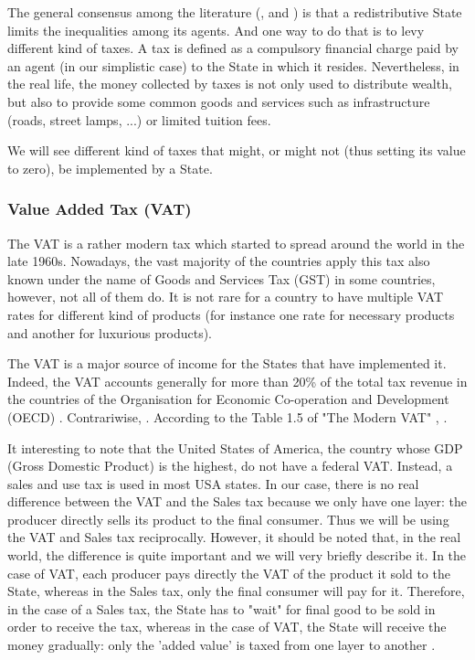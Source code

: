     The general consensus among the literature (\cite{burman2012taxes}, \cite{leigh2008redistributive} and \cite{taxes_inequalities}) is that a redistributive State limits the inequalities among its agents. And one way to do that is to levy different kind of taxes. A tax is defined as a compulsory financial charge paid by an agent (in our simplistic case) to the State in which it resides. 
    Nevertheless, in the real life, the money collected by taxes is not only used to distribute wealth, but also to provide some common goods and services such as infrastructure (roads, street lamps, ...) or limited tuition fees.
    
    We will see different kind of taxes that might, or might not (thus setting its value to zero), be implemented by a State.

    \subsubsection{Value Added Tax (VAT)}
    
    The VAT is a rather modern tax which started to spread around the world in the late 1960s. Nowadays, the vast majority of the countries apply this tax also known under the name of Goods and Services Tax (GST) in some countries, however, not all of them do. It is not rare for a country to have multiple VAT rates for different kind of products (for instance one rate for necessary products and another for luxurious products).
    
    The VAT is a major source of income for the States that have implemented it. Indeed, the VAT accounts generally for more than 20\% of the total tax revenue in the countries of the Organisation for Economic Co-operation and Development (OECD) \cite{TheModernVAT}. Contrariwise,  \cite{OriginOfVAT}. According to the Table 1.5 of "The Modern VAT" \cite{TheModernVAT}, . 
    
    It interesting to note that the United States of America, the country whose GDP (Gross Domestic Product) is the highest, do not have a federal VAT. Instead, a sales and use tax is used in most USA states. In our case, there is no real difference between the VAT and the Sales tax because we only have one layer: the producer directly sells its product to the final consumer. Thus we will be using the VAT and Sales tax reciprocally. 
    However, it should be noted that, in the real world, the difference is quite important and we will very briefly describe it. In the case of VAT, each producer pays directly the VAT of the product it sold to the State, whereas in the Sales tax, only the final consumer will pay for it. Therefore, in the case of a Sales tax, the State has to "wait" for final good to be sold in order to receive the tax, whereas in the case of VAT, the State will receive the money gradually: only the 'added value' is taxed from one layer to another \cite{OriginOfVAT}.
    
